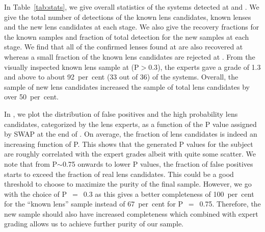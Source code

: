 \documentclass[useAMS,usenatbib,a4paper]{mn2e}
\begin{document}
In Table~\ref{tab:stats}, we give overall statistics of the systems
detected at \StageOne and \StageTwo. We give the total number of
detections of the known lens candidates, known lenses and the new lens
candidates at each stage.  We also give the recovery fractions for the
known samples and fraction of total detection for the new samples at
each stage. We find that all of the confirmed lenses found
at \StageOne are also recovered at \StageTwo whereas a small fraction of
the known lens candidates are rejected at \StageTwo. From the visually
inspected known lens sample at \StageTwo (P$> 0.3$), the experts gave a
grade of 1.3 and above to about 92~per~cent (33 out of 36) of the systems. Overall,
the sample of new \sw lens candidates increased the sample of total
\cfhtls lens candidates by over 50~per~cent.

In , we plot the distribution of false positives and
the high probability lens candidates, categorized by the lens experts,
as a function of the P value assigned by SWAP at the end of \StageTwo.
On average, the fraction of lens candidates is indeed an increasing
function of P. This shows that the \sw generated P values for the
subject are roughly correlated with the expert grades albeit with quite
some scatter.  We note that from P$\sim$0.75 onwards to lower P values,
the fraction of false positives starts to exceed the fraction of real
lens candidates. This could be a good threshold to choose to maximize
the purity of the final sample. However, we go with the choice of
P~$=$~0.3 as this gives a better completeness of 100~per~cent for the ``known
lens'' sample instead of 67~per~cent for P~$=$~0.75. Therefore, the new sample
should also have increased completeness which combined with expert
grading allows us to achieve further purity of our sample.
\end{document}
